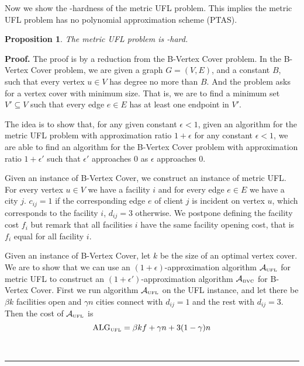 \documentclass[oneside,final]{ucr}
\newtheorem{proposition}[theorem]{Proposition}
\newenvironment{proof}[1][Proof]{\textbf{#1.} }{\ \rule{0.5em}{0.5em}}
\begin{document}
Now we show the {\MaxSNP}-hardness of the metric UFL problem. This
implies the metric UFL problem has no polynomial approximation scheme
(PTAS).
\begin{proposition}
  The metric UFL problem is {\MaxSNP}-hard.
\end{proposition}
\begin{proof}
  The proof is by a reduction from the B-Vertex Cover problem. In the
  B-Vertex Cover problem, we are given a graph $G=(V,E)$, and a
  constant $B$, such that every vertex $u\in V$ has degree no more
  than $B$. And the problem asks for a vertex cover with minimum
  size. That is, we are to find a minimum set $V' \subseteq V$ such
  that every edge $e \in E$ has at least one endpoint in $V'$.

  The idea is to show that, for any given constant $\epsilon < 1$,
  given an algorithm for the metric UFL problem with approximation
  ratio $1+\epsilon$ for any constant $\epsilon < 1$, we are able to
  find an algorithm for the B-Vertex Cover problem with approximation
  ratio $1+\epsilon'$ such that $\epsilon'$ approaches $0$ as
  $\epsilon$ approaches $0$.

  Given an instance of B-Vertex Cover, we construct an instance of
  metric UFL. For every vertex $u \in V$ we have a facility $i$ and
  for every edge $e \in E$ we have a city $j$. $c_{ij} = 1$ if the
  corresponding edge $e$ of client $j$ is incident on vertex $u$,
  which corresponds to the facility $i$, $d_{ij} = 3$ otherwise. We
  postpone defining the facility cost $f_i$ but remark that all
  facilities $i$ have the same facility opening cost, that is $f_i$
  equal for all facility $i$.

  Given an instance of B-Vertex Cover, let $k$ be the size of an
  optimal vertex cover. We are to show that we can use an
  $(1+\epsilon)$-approximation algorithm $\calA_{\smallUFL}$ for metric UFL
  to construct an $(1+\epsilon')$-approximation algorithm
  $\calA_{\smallBVC}$ for B-Vertex Cover. First we run algorithm
  $\calA_{\smallUFL}$ on the UFL instance, and let there be $\beta k$
  facilities open and $\gamma n$ cities connect with $d_{ij}=1$ and
  the rest with $d_{ij} = 3$. Then the cost of $\calA_{\smallUFL}$ is
  \begin{equation*}
    \mbox{\rm ALG}_{\mbox{\tiny\rm UFL}} = \beta k f + \gamma n + 3 (1 - \gamma) n
  \end{equation*}


\end{proof}
\end{document}
